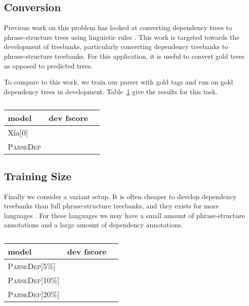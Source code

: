 \documentclass[11pt,letterpaper]{article}
\begin{document}
\subsection{Conversion}

Previous work on this problem has looked at converting dependency trees to phrase-structure trees using linguistic rules \cite{xia2001converting,xia2009towards}. This work is targeted towards the development of treebanks, particularly converting dependency treebanks to phrase-structure treebanks.
For this application, it is useful to convert gold trees as opposed to predicted trees.

To compare to this work, we train our parser with gold tags and run on gold dependency trees in development. Table~\ref{tab:convert} give the results for this task.


\begin{table}
  \centering
  \begin{tabular}{|l|ll|}

    \hline
    model & dev fscore & \\
    \hline

    \hline
    Xia[0] & & \\
    \textsc{ParseDep}  & & \\
    \hline

  \end{tabular}
  \caption{}
  \label{tab:convert}
\end{table}

\subsection{Training Size}

Finally we consider a variant setup. It is often cheaper to develop
dependency treebanks than full phrase-structure treebanks, and they
exists for more languages \cite{}. For these languages we may have a small
amount of phrase-structure annotations and a large amount of dependency annotations.

\begin{table}
  \centering
  \begin{tabular}{|l|ll|}

    \hline
    model & dev fscore & \\
    \hline

    \hline
    \textsc{ParseDep[5\%]}  & & \\
    \textsc{ParseDep[10\%]}  & & \\
    \textsc{ParseDep[20\%]}  & & \\
    \hline

  \end{tabular}
  \caption{}
  \label{tab:size}
\end{table}
\end{document}
